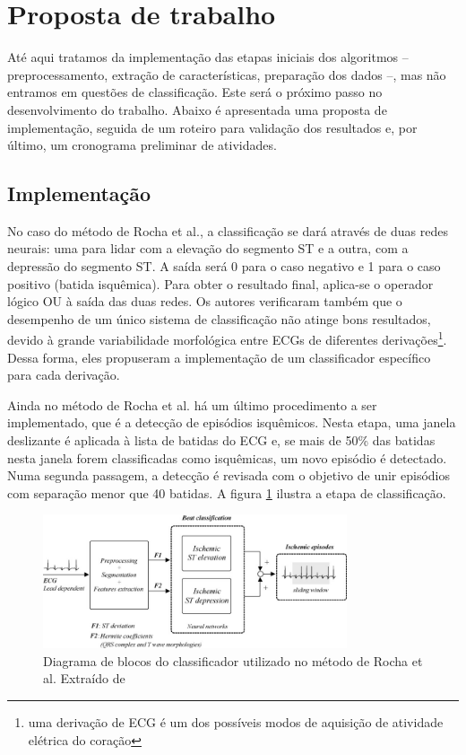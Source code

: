 
\section{Proposta de trabalho}
\label{sec:section5}
Até aqui tratamos da implementação das etapas iniciais dos algoritmos -- preprocessamento, extração de características, preparação dos dados --, mas não entramos em questões de classificação. Este será o próximo passo no desenvolvimento do trabalho. Abaixo é apresentada uma proposta de implementação, seguida de um roteiro para validação dos resultados e, por último, um cronograma preliminar de atividades.

\subsection{Implementação}
No caso do método de Rocha et al., a classificação se dará através de duas redes neurais: uma para lidar com a elevação do segmento ST e a outra, com a depressão do segmento ST. A saída será 0 para o caso negativo e 1 para o caso positivo (batida isquêmica). Para obter o resultado final, aplica-se o operador lógico OU à saída das duas redes. Os autores verificaram também que o desempenho de um único sistema de classificação não atinge bons resultados, devido à grande variabilidade morfológica entre ECGs de diferentes derivações\footnote{uma derivação de ECG é um dos possíveis modos de aquisição de atividade elétrica do coração}. Dessa forma, eles propuseram a implementação de um classificador específico para cada derivação.

Ainda no método de Rocha et al. há um último procedimento a ser implementado, que é a detecção de episódios isquêmicos. Nesta etapa, uma janela deslizante é aplicada à lista de batidas do ECG e, se mais de 50\% das batidas nesta janela  forem classificadas como isquêmicas, um novo episódio é detectado. Numa segunda passagem, a detecção é revisada com o objetivo de unir episódios com separação menor que 40 batidas. A figura \ref{fig:rocha_03} ilustra a etapa de classificação.

\begin{figure}[ht]
    \centering
    \includegraphics[width=0.8\textwidth]{figures/rocha_03.png}
    \caption{Diagrama de blocos do classificador utilizado no método de Rocha et al. Extraído de \cite{Rocha10}}
    \label{fig:rocha_03}
\end{figure}

